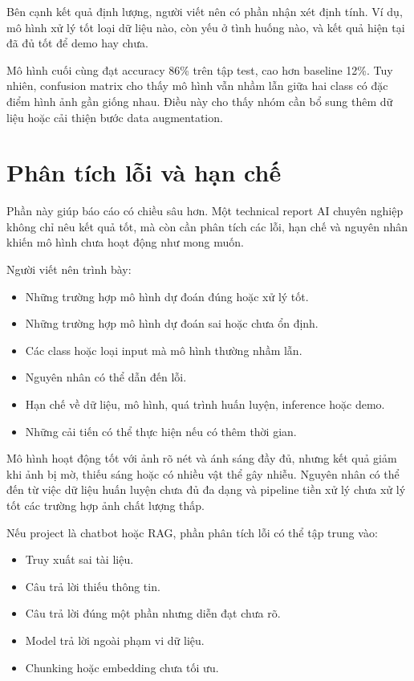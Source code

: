\documentclass[12pt]{ai_conquer2026}
\begin{document}
Bên cạnh kết quả định lượng, người viết nên có phần nhận xét định tính. Ví dụ, mô hình xử lý tốt loại dữ liệu nào, còn yếu ở tình huống nào, và kết quả hiện tại đã đủ tốt để demo hay chưa.



\begin{aivncodebox}[Ví dụ:]
Mô hình cuối cùng đạt accuracy 86\% trên tập test, cao hơn baseline 12\%. Tuy nhiên, confusion matrix cho thấy mô hình vẫn nhầm lẫn giữa hai class có đặc điểm hình ảnh gần giống nhau. Điều này cho thấy nhóm cần bổ sung thêm dữ liệu hoặc cải thiện bước data augmentation.
\end{aivncodebox}

\section{Phân tích lỗi và hạn chế}

Phần này giúp báo cáo có chiều sâu hơn. Một technical report AI chuyên nghiệp không chỉ nêu kết quả tốt, mà còn cần phân tích các lỗi, hạn chế và nguyên nhân khiến mô hình chưa hoạt động như mong muốn.

Người viết nên trình bày:

\begin{itemize}
\item Những trường hợp mô hình dự đoán đúng hoặc xử lý tốt.
\item Những trường hợp mô hình dự đoán sai hoặc chưa ổn định.
\item Các class hoặc loại input mà mô hình thường nhầm lẫn.
\item Nguyên nhân có thể dẫn đến lỗi.
\item Hạn chế về dữ liệu, mô hình, quá trình huấn luyện, inference hoặc demo.
\item Những cải tiến có thể thực hiện nếu có thêm thời gian.
\end{itemize}



\begin{aivncodebox}[Ví dụ:]
Mô hình hoạt động tốt với ảnh rõ nét và ánh sáng đầy đủ, nhưng kết quả giảm khi ảnh bị mờ, thiếu sáng hoặc có nhiều vật thể gây nhiễu. Nguyên nhân có thể đến từ việc dữ liệu huấn luyện chưa đủ đa dạng và pipeline tiền xử lý chưa xử lý tốt các trường hợp ảnh chất lượng thấp.
\end{aivncodebox}

\newpage

\begin{aivncodebox}[Ví dụ:]
Nếu project là chatbot hoặc RAG, phần phân tích lỗi có thể tập trung vào:
\begin{itemize}
\item Truy xuất sai tài liệu.
\item Câu trả lời thiếu thông tin.
\item Câu trả lời đúng một phần nhưng diễn đạt chưa rõ.
\item Model trả lời ngoài phạm vi dữ liệu.
\item Chunking hoặc embedding chưa tối ưu.
\end{itemize}
\end{aivncodebox}
\end{document}
